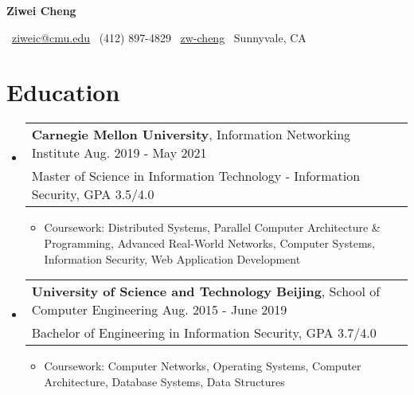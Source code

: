 \documentclass[letterpaper,11pt]{article}
\newcommand{\resumeItem}[2]{
  \item\small{
    \textbf{#1}{ #2 \vspace{-2pt}}
  }
}
\newcommand{\resumeSubheading}[5]{
    \setlength{\itemindent}{-9pt}
    \item[]
    \begin{tabular*}{.99\textwidth}{p{0.99\textwidth}}
      {\textbf{{#1}}}{{#2}} \hfill{\small{#3}} \\
      {\small{#4}} \hfill{\small{#5}} \\
    \end{tabular*}
    \vspace{-7pt}
}
\newcommand{\resumeSubHeadingListStart}{\begin{itemize}[leftmargin=*]}
\newcommand{\resumeSubHeadingListEnd}{\end{itemize}\vspace{-14pt}}
\newcommand{\resumeItemListStart}{\vspace{0pt}\begin{itemize}[leftmargin=*]\setlength{\itemindent}{-9pt}}
\newcommand{\resumeItemListEnd}{\end{itemize}\vspace{-5pt}}
\begin{document}
\begin{center}
  
  \textbf{{\LARGE Ziwei Cheng}}
  
  
  \vspace{2pt}
  
  \faEnvelope\ \href{mailto://ziweic@cmu.edu}{ziweic@cmu.edu} \hspace{1pt}
  \faPhone\ (412) 897-4829 \hspace{1pt} 
  \faGithub\ \href{https://www.github.com/zw-cheng}{zw-cheng} \hspace{1pt} 
  \faHome\ Sunnyvale, CA
  
  
  \vspace{-10pt}
\end{center}

\section{Education}
  \resumeSubHeadingListStart
  \resumeSubheading{Carnegie Mellon University}{, Information Networking Institute}{Aug. 2019 - May 2021}{\textbf{}Master of Science in Information Technology - Information Security, GPA 3.5/4.0}{}
      \resumeItemListStart
      \resumeItem{}{Coursework: Distributed Systems, Parallel Computer Architecture \& Programming, Advanced Real-World Networks, Computer Systems, Information Security, Web Application Development}
      \resumeItemListEnd
    \resumeSubheading
      {University of Science and Technology Beijing}{, School of Computer Engineering}{Aug. 2015 - June 2019}{\textbf{}Bachelor of Engineering in Information Security, GPA 3.7/4.0}{}
      \resumeItemListStart
      \resumeItem{}{Coursework: Computer Networks, Operating Systems, Computer Architecture, Database Systems, Data Structures}
      \resumeItemListEnd
  \resumeSubHeadingListEnd
  
\end{document}

